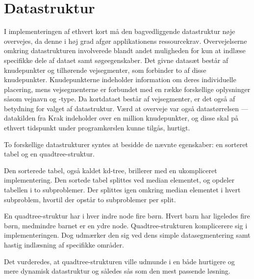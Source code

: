\section{Datastruktur}
\label{sec:datastruktur}
I implementeringen af ethvert kort må den bagvedliggende datastruktur nøje overvejes, da denne i høj grad afgør applikationens ressourcekrav. Overvejelserne omkring datastrukturen involverede blandt andet muligheden for kun at indlæse specifikke dele af dataet samt søgeegenskaber. Det givne datasæt består af knudepunkter og tilhørende vejsegmenter, som forbinder to af disse knudepunkter. Knudepunkterne indeholder information om deres individuelle placering, mens vejsegmenterne er forbundet med en række forskellige oplysninger såsom vejnavn og -type. Da kortdataet består af vejsegmenter, er det også af betydning for valget af datastruktur. Værd at overveje var også datastørrelsen --- datakilden fra Krak indeholder over en million knudepunkter, og disse skal på ethvert tidspunkt under programkørslen kunne tilgås, hurtigt.

To forskellige datastrukturer syntes at besidde de nævnte egenskaber: en sorteret tabel og en quadtree-struktur. 

Den sorterede tabel, også kaldet kd-tree, brillerer med en ukompliceret implementering. Den sortede tabel splittes ved median elementet, og opdeler tabellen i to subproblemer. Der splittes igen omkring median elementet i hvert subproblem, hvortil der opstår to subproblemer per split. 

En quadtree-struktur har i hver indre node fire børn. Hvert barn har ligeledes fire børn, medmindre barnet er en ydre node. Quadtree-strukturen komplicerere sig i implementeringen. Dog udmærker den sig ved dens simple datasegmentering samt hastig indlæsning af specifikke områder. 

Det vurderedes, at quadtree-strukturen ville udmunde i en både hurtigere og mere dynamisk datastruktur og således sås som den mest passende løsning.